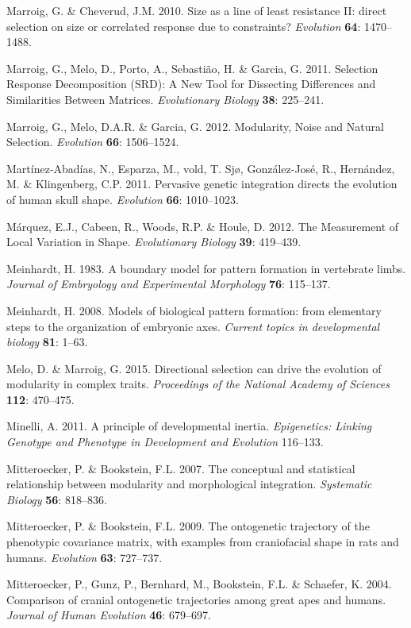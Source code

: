 \documentclass[12pt,twoside]{report}
\begin{document}
Marroig, G. \& Cheverud, J.M. 2010. Size as a line of least resistance
II: direct selection on size or correlated response due to constraints?
\emph{Evolution} \textbf{64}: 1470--1488.

Marroig, G., Melo, D., Porto, A., Sebastião, H. \& Garcia, G. 2011.
Selection Response Decomposition (SRD): A New Tool for Dissecting
Differences and Similarities Between Matrices. \emph{Evolutionary
Biology} \textbf{38}: 225--241.

Marroig, G., Melo, D.A.R. \& Garcia, G. 2012. Modularity, Noise and
Natural Selection. \emph{Evolution} \textbf{66}: 1506--1524.

Martínez-Abadías, N., Esparza, M., vold, T. Sjø, González-José, R.,
Hernández, M. \& Klingenberg, C.P. 2011. Pervasive genetic integration
directs the evolution of human skull shape. \emph{Evolution}
\textbf{66}: 1010--1023.

Márquez, E.J., Cabeen, R., Woods, R.P. \& Houle, D. 2012. The
Measurement of Local Variation in Shape. \emph{Evolutionary Biology}
\textbf{39}: 419--439.

Meinhardt, H. 1983. A boundary model for pattern formation in vertebrate
limbs. \emph{Journal of Embryology and Experimental Morphology}
\textbf{76}: 115--137.

Meinhardt, H. 2008. Models of biological pattern formation: from
elementary steps to the organization of embryonic axes. \emph{Current
topics in developmental biology} \textbf{81}: 1--63.

Melo, D. \& Marroig, G. 2015. Directional selection can drive the
evolution of modularity in complex traits. \emph{Proceedings of the
National Academy of Sciences} \textbf{112}: 470--475.

Minelli, A. 2011. A principle of developmental inertia.
\emph{Epigenetics: Linking Genotype and Phenotype in Development and
Evolution} 116--133.

Mitteroecker, P. \& Bookstein, F.L. 2007. The conceptual and statistical
relationship between modularity and morphological integration.
\emph{Systematic Biology} \textbf{56}: 818--836.

Mitteroecker, P. \& Bookstein, F.L. 2009. The ontogenetic trajectory of
the phenotypic covariance matrix, with examples from craniofacial shape
in rats and humans. \emph{Evolution} \textbf{63}: 727--737.

Mitteroecker, P., Gunz, P., Bernhard, M., Bookstein, F.L. \& Schaefer,
K. 2004. Comparison of cranial ontogenetic trajectories among great apes
and humans. \emph{Journal of Human Evolution} \textbf{46}: 679--697.
\end{document}
